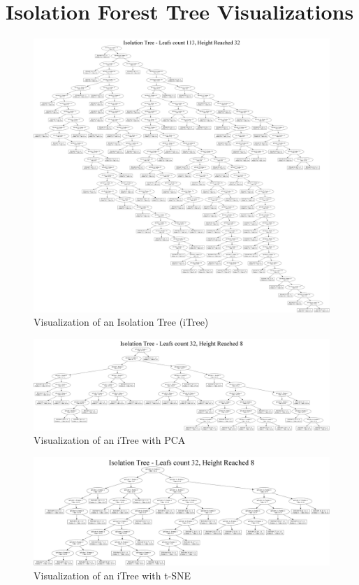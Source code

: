 
\appendix
\newpage
\onecolumn
\section{Isolation Forest Tree Visualizations}

\begin{figure}[htbp]
\centering
\includegraphics[width=1\textwidth]{resources/images/itree_graph.png}
\caption{Visualization of an Isolation Tree (iTree)}
\label{fig:itree_appendix}
\end{figure}

\begin{figure}[htbp]
\centering
\includegraphics[width=1\textwidth]{resources/images/itree_pca_graph.png}
\caption{Visualization of an iTree with PCA}
\label{fig:pca_itree_appendix}
\end{figure}

\begin{figure}[htbp]
\centering
\includegraphics[width=1\textwidth]{resources/images/itree_tsne_graph.png}
\caption{Visualization of an iTree with t-SNE}
\label{fig:tsne_itree_appendix}
\end{figure}